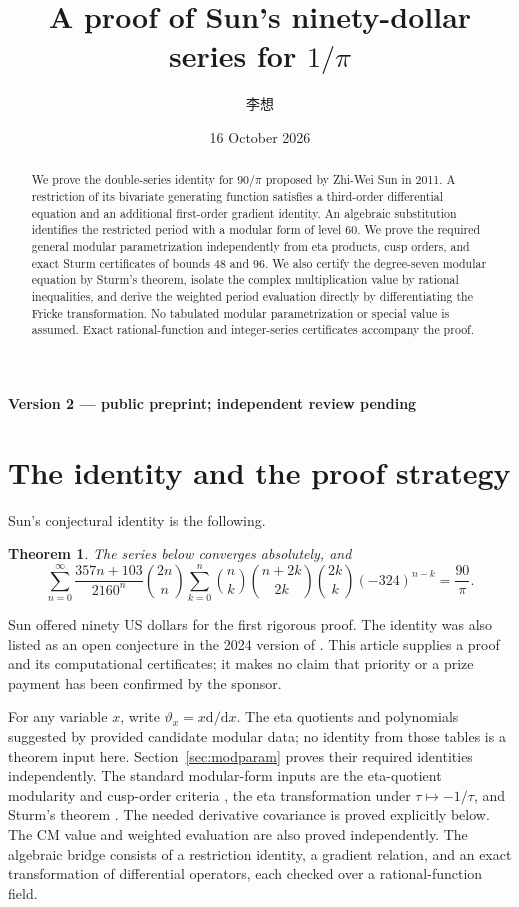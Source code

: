 \documentclass[11pt,a4paper]{article}
\title{A proof of Sun's ninety-dollar series for $1/\pi$}
\author{李想}
\date{16 October 2026}
\newtheorem{theorem}{Theorem}
\theoremstyle{remark}
\newcommand{\tht}{\vartheta}
\newcommand{\dd}{\mathrm d}
\begin{document}
\maketitle
\begin{center}
\small\textbf{Version 2 --- public preprint; independent review pending}
\end{center}
\begin{abstract}
We prove the double-series identity for $90/\pi$ proposed by Zhi-Wei Sun
in 2011. A restriction of its bivariate generating function satisfies a
third-order differential equation and an additional first-order gradient
identity. An algebraic substitution identifies the restricted period with
a modular form of level $60$. We prove the required general modular
parametrization independently from eta products, cusp orders, and exact
Sturm certificates of bounds $48$ and $96$. We also certify the degree-seven
modular equation by Sturm's theorem, isolate the complex multiplication
value by rational inequalities, and derive the weighted period evaluation
directly by differentiating the Fricke transformation. No tabulated
modular parametrization or special value is assumed. Exact rational-function
and integer-series certificates accompany the proof.
\end{abstract}

\section{The identity and the proof strategy}
Sun's conjectural identity \cite[Conjecture 5, (5.9)]{Sun} is the following.
\begin{theorem}\label{thm:main}
The series below converges absolutely, and
\begin{equation}\label{eq:main}
 \sum_{n=0}^{\infty}\frac{357n+103}{2160^n}\binom{2n}{n}
 \sum_{k=0}^{n}\binom nk\binom{n+2k}{2k}\binom{2k}{k}
                 (-324)^{n-k}=\frac{90}{\pi}.
\end{equation}
\end{theorem}
Sun offered ninety US dollars for the first rigorous proof. The identity
was also listed as an open conjecture in the 2024 version of
\cite[Section 4, (4.3)]{vHTY}. This article supplies a proof and its
computational certificates; it makes no claim that priority or a prize
payment has been confirmed by the sponsor.

For any variable $x$, write $\tht_x=x\dd/\dd x$.
The eta quotients and polynomials suggested by
\cite[Tables 2--4]{CCY} provided candidate modular data; no identity
from those tables is a theorem input here. Section~\ref{sec:modparam}
proves their required identities independently. The standard modular-form
inputs are the eta-quotient modularity and cusp-order criteria
\cite{Newman,Ligozat}, the eta transformation under $\tau\mapsto-1/\tau$,
and Sturm's theorem \cite{Sturm}. The needed derivative covariance is
proved explicitly below. The CM value and weighted evaluation are also
proved independently. The algebraic bridge consists of a restriction
identity, a gradient relation, and an exact transformation of differential
operators, each checked over a rational-function field.
\end{document}
